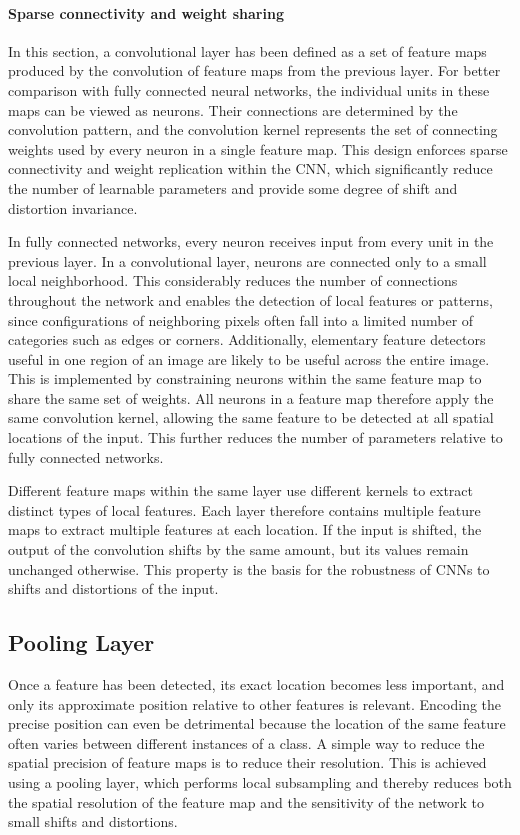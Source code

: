 \paragraph{Sparse connectivity and weight sharing}
In this section, a convolutional layer has been defined as a set of feature maps produced by the convolution of feature maps from the previous layer. For better comparison with fully connected neural networks, the individual units in these maps can be viewed as neurons. Their connections are determined by the convolution pattern, and the convolution kernel represents the set of connecting weights used by every neuron in a single feature map. This design enforces sparse connectivity and weight replication within the CNN, which significantly reduce the number of learnable parameters and provide some degree of shift and distortion invariance.

In fully connected networks, every neuron receives input from every unit in the previous layer. In a convolutional layer, neurons are connected only to a small local neighborhood. This considerably reduces the number of connections throughout the network and enables the detection of local features or patterns, since configurations of neighboring pixels often fall into a limited number of categories such as edges or corners. Additionally, elementary feature detectors useful in one region of an image are likely to be useful across the entire image. This is implemented by constraining neurons within the same feature map to share the same set of weights. All neurons in a feature map therefore apply the same convolution kernel, allowing the same feature to be detected at all spatial locations of the input. This further reduces the number of parameters relative to fully connected networks.

Different feature maps within the same layer use different kernels to extract distinct types of local features. Each layer therefore contains multiple feature maps to extract multiple features at each location. If the input is shifted, the output of the convolution shifts by the same amount, but its values remain unchanged otherwise. This property is the basis for the robustness of CNNs to shifts and distortions of the input.~\cite{Lecun1998}

\subsection{Pooling Layer}
Once a feature has been detected, its exact location becomes less important, and only its approximate position relative to other features is relevant. Encoding the precise position can even be detrimental because the location of the same feature often varies between different instances of a class. A simple way to reduce the spatial precision of feature maps is to reduce their resolution. This is achieved using a pooling layer, which performs local subsampling and thereby reduces both the spatial resolution of the feature map and the sensitivity of the network to small shifts and distortions.~\cite{Lecun1998}

